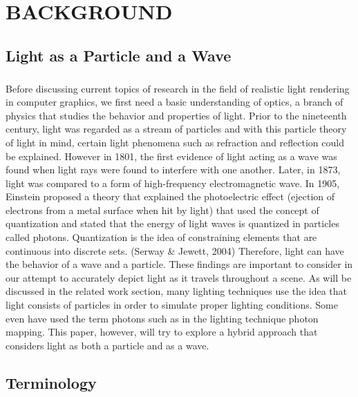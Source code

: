 \chapter{BACKGROUND}

\section{Light as a Particle and a Wave}
\paragraph{}
Before discussing current topics of research in the field of realistic light rendering in computer graphics, we first need a basic understanding of optics, a branch of physics that studies the behavior and properties of light.  Prior to the nineteenth century, light was regarded as a stream of particles and with this particle theory of light in mind, certain light phenomena such as refraction and reflection could be explained.  However in 1801, the first evidence of light acting as a wave was found when light rays were found to interfere with one another.  Later, in 1873, light was compared to a form of high-frequency electromagnetic wave.  In 1905, Einstein proposed a theory that explained the photoelectric effect (ejection of electrons from a metal surface when hit by light) that used the concept of quantization and stated that the energy of light waves is quantized in particles called photons. Quantization is the idea of constraining elements that are continuous into discrete sets. (Serway \& Jewett, 2004)  Therefore, light can have the behavior of a wave and a particle.  These findings are important to consider in our attempt to accurately depict light as it travels throughout a scene.  As will be discussed in the related work section, many lighting techniques use the idea that light consists of particles in order to simulate proper lighting conditions.  Some even have used the term photons such as in the lighting technique photon mapping.  This paper, however, will try to explore a hybrid approach that considers light as both a particle and as a wave.

\section{Terminology}
